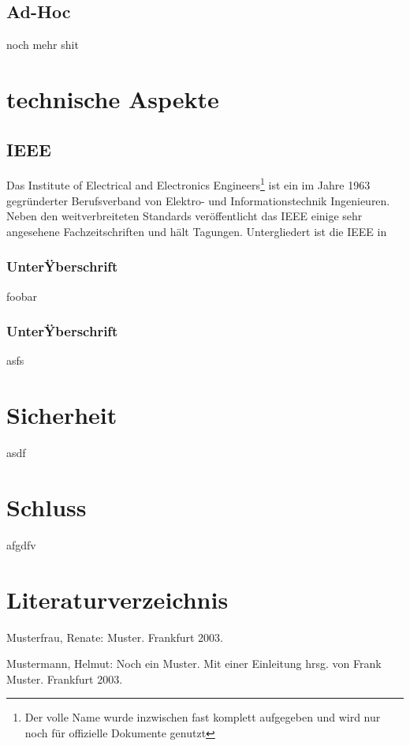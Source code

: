 \documentclass[a4paper,13pt]{scrartcl}
\begin{document}
\subsection{Ad-Hoc}

noch mehr shit

\section{technische Aspekte}
\subsection{IEEE}
Das Institute of Electrical and Electronics Engineers\footnote{Der volle Name wurde inzwischen fast komplett aufgegeben und wird nur noch für offizielle Dokumente genutzt} ist ein im Jahre 1963 gegründerter Berufsverband von Elektro- und Informationstechnik Ingenieuren. Neben den weitverbreiteten Standards veröffentlicht das IEEE einige sehr angesehene Fachzeitschriften und hält Tagungen. 
Untergliedert ist die IEEE in 
\subsubsection{UnterŸberschrift}
foobar
\subsubsection{UnterŸberschrift}
asfs
\section{Sicherheit}
asdf

\section{Schluss}
afgdfv

\clearpage

\section{Literaturverzeichnis}

Musterfrau, Renate: Muster. Frankfurt 2003.


Mustermann, Helmut: Noch ein Muster. Mit einer Einleitung hrsg. von Frank Muster. Frankfurt 2003.
\end{document}
